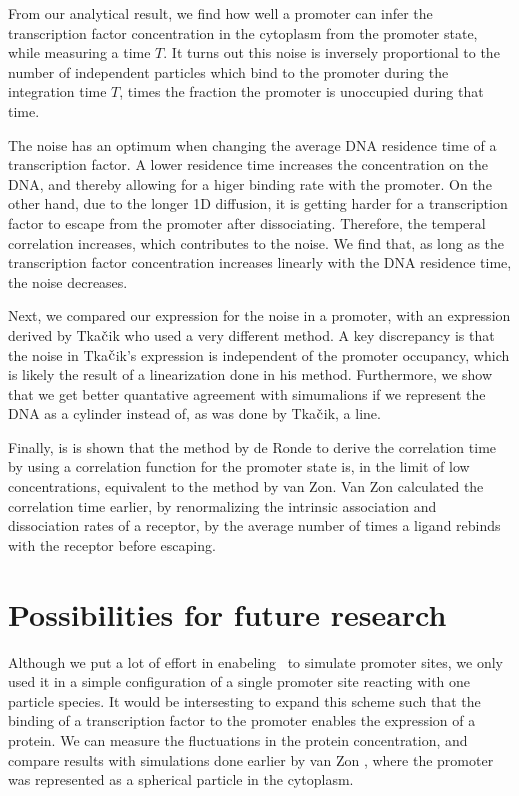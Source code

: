 From our analytical result, we find how well a promoter can infer the transcription factor concentration in the cytoplasm from the promoter state, while measuring a time $T$. It turns out this noise is inversely proportional to the number of independent particles which bind to the promoter during the integration time $T$, times the fraction the promoter is unoccupied during that time.

The noise has an optimum when changing the average DNA residence time of a transcription factor. A lower residence time increases the concentration on the DNA, and thereby allowing for a higer binding rate with the promoter. On the other hand, due to the longer 1D diffusion, it is getting harder for a transcription factor to escape from the promoter after dissociating. Therefore, the temperal correlation increases, which contributes to the noise. We find that, as long as the transcription factor concentration increases linearly with the DNA residence time, the noise decreases.

Next, we compared our expression for the noise in a promoter, with an expression derived by Tka$\check{\rm c}$ik who used a very different method. A key discrepancy is that the noise in Tka$\check{\rm c}$ik's expression is independent of the promoter occupancy, which is likely the result of a linearization done in his method. Furthermore, we show that we get better quantative agreement with simumalions if we represent the DNA as a cylinder instead of, as was done by Tka$\check{\rm c}$ik, a line. 

Finally, is is shown that the method by de Ronde to derive the correlation time by using a correlation function for the promoter state is, in the limit of low concentrations, equivalent to the method by van Zon. Van Zon calculated the correlation time earlier, by renormalizing the intrinsic association and dissociation rates of a receptor, by the average number of times a ligand rebinds with the receptor before escaping.

\newpage

\section{Possibilities for future research}
Although we put a lot of effort in enabeling \GFRD\, to simulate promoter sites, we only used it in a simple configuration of a single promoter site reacting with one particle species. It would be intersesting to expand this scheme such that the binding of a transcription factor to the promoter enables the expression of a protein. We can measure the fluctuations in the protein concentration, and compare results with simulations done earlier by van Zon \cite{VanZon2006}, where the promoter was represented as a spherical particle in the cytoplasm. 

